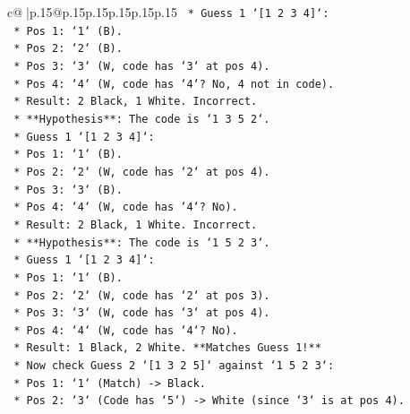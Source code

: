 \documentclass{article}
\begin{document}
{\begin{supertabular}{c@{$\;$}|p{.15\linewidth}@{}p{.15\linewidth}p{.15\linewidth}p{.15\linewidth}p{.15\linewidth}p{.15\linewidth}}
{{{\texttt{                        *   Guess 1 `{[}1 2 3 4{]}`:} \\
\texttt{                            *   Pos 1: `1` (B).} \\
\texttt{                            *   Pos 2: `2` (B).} \\
\texttt{                            *   Pos 3: `3` (W, code has `3` at pos 4).} \\
\texttt{                            *   Pos 4: `4` (W, code has `4`? No, 4 not in code).} \\
\texttt{                            *   Result: 2 Black, 1 White. Incorrect.} \\
\texttt{                    *   **Hypothesis**: The code is `1 3 5 2`.} \\
\texttt{                        *   Guess 1 `{[}1 2 3 4{]}`:} \\
\texttt{                            *   Pos 1: `1` (B).} \\
\texttt{                            *   Pos 2: `2` (W, code has `2` at pos 4).} \\
\texttt{                            *   Pos 3: `3` (B).} \\
\texttt{                            *   Pos 4: `4` (W, code has `4`? No).} \\
\texttt{                            *   Result: 2 Black, 1 White. Incorrect.} \\
\texttt{                    *   **Hypothesis**: The code is `1 5 2 3`.} \\
\texttt{                        *   Guess 1 `{[}1 2 3 4{]}`:} \\
\texttt{                            *   Pos 1: `1` (B).} \\
\texttt{                            *   Pos 2: `2` (W, code has `2` at pos 3).} \\
\texttt{                            *   Pos 3: `3` (W, code has `3` at pos 4).} \\
\texttt{                            *   Pos 4: `4` (W, code has `4`? No).} \\
\texttt{                            *   Result: 1 Black, 2 White. **Matches Guess 1!**} \\
\texttt{                        *   Now check Guess 2 `{[}1 3 2 5{]}` against `1 5 2 3`:} \\
\texttt{                            *   Pos 1: `1` (Match) {-}> Black.} \\
\texttt{                            *   Pos 2: `3` (Code has `5`) {-}> White (since `3` is at pos 4).} \\
}}}
\end{supertabular}}
\end{document}
